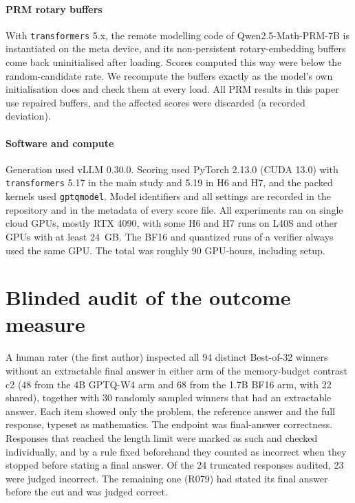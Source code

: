 \paragraph{PRM rotary buffers}\label{app:prm} With \texttt{transformers} 5.x, the remote
modelling code of Qwen2.5-Math-PRM-7B is instantiated on the meta device, and its
non-persistent rotary-embedding buffers come back uninitialised after loading. Scores
computed this way were below the random-candidate rate. We recompute the buffers exactly
as the model's own initialisation does and check them at every load. All PRM results in
this paper use repaired buffers, and the affected scores were discarded (a recorded
deviation).

\paragraph{Software and compute} Generation used vLLM 0.30.0. Scoring used PyTorch
2.13.0 (CUDA 13.0) with \texttt{transformers} 5.17 in the main study and 5.19 in H6 and H7, and the packed kernels used \texttt{gptqmodel}. Model identifiers and
all settings are recorded in the repository and in the metadata of every score file.
All experiments ran on single cloud GPUs, mostly RTX 4090, with some H6 and H7 runs on
L40S and other GPUs with at least 24~GB. The BF16 and quantized runs of a verifier
always used the same GPU. The total was roughly 90 GPU-hours, including setup.

\section{Blinded audit of the outcome measure}\label{app:audit}

A human rater (the first author) inspected all 94 distinct Best-of-32 winners without
an extractable final answer in either arm of the memory-budget contrast c2 (48 from the
4B GPTQ-W4 arm and 68 from the 1.7B BF16 arm, with 22 shared), together with 30 randomly
sampled winners that had an extractable answer. Each item showed only the problem, the
reference answer and the full response, typeset as mathematics. The endpoint was
final-answer correctness. Responses that reached the length limit were marked as such
and checked individually, and by a rule fixed beforehand they counted as incorrect when
they stopped before stating a final answer. Of the 24 truncated responses audited, 23
were judged incorrect. The remaining one (R079) had stated its final answer before the
cut and was judged correct.

